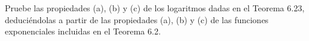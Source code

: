 \item Pruebe las propiedades (a), (b) y (c) de los logaritmos dadas en el Teorema 6.23, deduciéndolas a partir de las propiedades (a), (b) y (c) de las funciones exponenciales incluidas en el Teorema 6.2.
